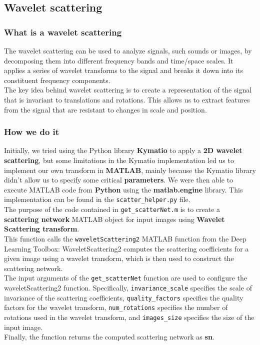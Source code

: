 \documentclass{report}
\begin{document}
\subsection{Wavelet scattering}
\subsubsection{What is a wavelet scattering}
The wavelet scattering can be used to analyze signals, such sounds or images, by decomposing them into different frequency bands and time/space scales. It applies a series of wavelet transforms to the signal and breaks it down into its constituent frequency components.\\
The key idea behind wavelet scattering is to create a representation of the signal that is invariant to translations and rotations. This allows us to extract features from the signal that are resistant to changes in scale and position.
\subsubsection{How we do it}
Initially, we tried using the Python library \textbf{Kymatio} to apply a \textbf{2D wavelet scattering}, but some limitations in the Kymatio implementation led us to implement 
our own transform in \textbf{MATLAB}, mainly because the Kymatio library didn't allow us to specify some critical \textbf{parameters}. We were then able to execute MATLAB code from \textbf{Python} using 
the \textbf{matlab.engine} library. This implementation can be found in the \texttt{scatter\_helper.py} file.\\

The purpose of the code contained in \texttt{get\_scatterNet.m} is to create a \textbf{scattering network} MATLAB object for input images using 
 \textbf{Wavelet Scattering transform}.\\
This function calls the \texttt{waveletScattering2} MATLAB function from the Deep Learning Toolbox: WaveletScattering2 computes the scattering coefficients for a given image using a wavelet transform, which is then used to construct the scattering network. \\
The input arguments of the \texttt{get\_scatterNet} function are used to configure the waveletScattering2 function. Specifically, \texttt{invariance\_scale} specifies the scale of invariance of the scattering coefficients, \texttt{quality\_factors} specifies the quality factors for the wavelet transform, \texttt{num\_rotations} specifies the number of rotations used in the wavelet transform, and \texttt{images\_size} specifies the size of the input image.\\
Finally, the function returns the computed scattering network as \textbf{sn}.\\
\end{document}
